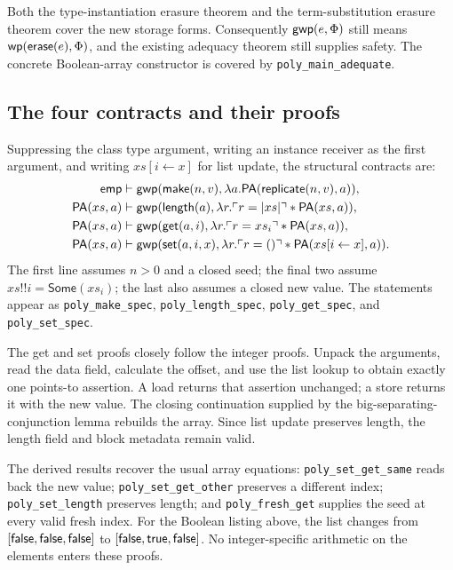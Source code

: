 Both the type-instantiation erasure theorem and the term-substitution
erasure theorem cover the new storage forms. Consequently
$\mathsf{gwp}(e,\Phi)$ still means $\mathsf{wp}(\mathsf{erase}(e),\Phi)$,
and the existing adequacy theorem still supplies safety. The concrete
Boolean-array constructor is covered by \texttt{poly\_main\_adequate}.

\subsection{The four contracts and their proofs}

Suppressing the class type argument, writing an instance receiver as the
first argument, and writing $xs[i\leftarrow x]$
for list update, the structural contracts are:
\[
\begin{aligned}
\mathsf{emp} &\vdash \mathsf{gwp}(\mathsf{make}(n,v),
  \lambda a.\mathsf{PA}(\mathsf{replicate}(n,v),a)),\\
\mathsf{PA}(xs,a) &\vdash \mathsf{gwp}(\mathsf{length}(a),
  \lambda r.\ulcorner r=|xs| \urcorner\mathbin{*}\mathsf{PA}(xs,a)),\\
\mathsf{PA}(xs,a) &\vdash \mathsf{gwp}(\mathsf{get}(a,i),
  \lambda r.\ulcorner r=xs_i \urcorner\mathbin{*}\mathsf{PA}(xs,a)),\\
\mathsf{PA}(xs,a) &\vdash \mathsf{gwp}(\mathsf{set}(a,i,x),
  \lambda r.\ulcorner r=() \urcorner\mathbin{*}\mathsf{PA}(xs[i\leftarrow x],a)).
\end{aligned}
\]
The first line assumes $n>0$ and a closed seed; the final two assume
$xs!!i=\mathsf{Some}(xs_i)$; the last also assumes a closed new value.
The statements appear as \texttt{poly\_make\_spec},
\texttt{poly\_length\_spec}, \texttt{poly\_get\_spec}, and
\texttt{poly\_set\_spec}.

The get and set proofs closely follow the integer proofs. Unpack the
arguments, read the data field, calculate the offset, and use the list
lookup to obtain exactly one points-to assertion. A load returns that
assertion unchanged; a store returns it with the new value. The closing
continuation supplied by the big-separating-conjunction lemma rebuilds
the array. Since list update preserves length, the length field and block
metadata remain valid.

The derived results recover the usual array equations:
\texttt{poly\_set\_get\_same} reads back the new value;
\texttt{poly\_set\_get\_other} preserves a different index;
\texttt{poly\_set\_length} preserves length; and
\texttt{poly\_fresh\_get} supplies the seed at every valid fresh index.
For the Boolean listing above, the list changes from
$[\mathsf{false},\mathsf{false},\mathsf{false}]$ to $[\mathsf{false},\mathsf{true},\mathsf{false}]$.
No integer-specific arithmetic on the elements enters these proofs.

